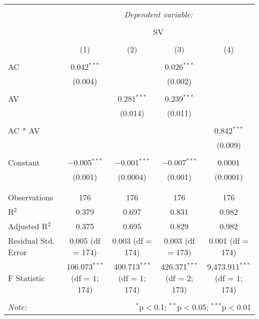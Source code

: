 
\begin{table}[!htbp] \centering 
  \caption{} 
  \label{} 
\begin{tabular}{@{\extracolsep{5pt}}lcccc} 
\\[-1.8ex]\hline 
\hline \\[-1.8ex] 
 & \multicolumn{4}{c}{\textit{Dependent variable:}} \\ 
\cline{2-5} 
\\[-1.8ex] & \multicolumn{4}{c}{SV} \\ 
\\[-1.8ex] & (1) & (2) & (3) & (4)\\ 
\hline \\[-1.8ex] 
 AC & 0.042$^{***}$ &  & 0.026$^{***}$ &  \\ 
  & (0.004) &  & (0.002) &  \\ 
  & & & & \\ 
 AV &  & 0.281$^{***}$ & 0.239$^{***}$ &  \\ 
  &  & (0.014) & (0.011) &  \\ 
  & & & & \\ 
 AC * AV &  &  &  & 0.842$^{***}$ \\ 
  &  &  &  & (0.009) \\ 
  & & & & \\ 
 Constant & $-$0.005$^{***}$ & $-$0.001$^{***}$ & $-$0.007$^{***}$ & 0.0001 \\ 
  & (0.001) & (0.0004) & (0.001) & (0.0001) \\ 
  & & & & \\ 
\hline \\[-1.8ex] 
Observations & 176 & 176 & 176 & 176 \\ 
R$^{2}$ & 0.379 & 0.697 & 0.831 & 0.982 \\ 
Adjusted R$^{2}$ & 0.375 & 0.695 & 0.829 & 0.982 \\ 
Residual Std. Error & 0.005 (df = 174) & 0.003 (df = 174) & 0.003 (df = 173) & 0.001 (df = 174) \\ 
F Statistic & 106.073$^{***}$ (df = 1; 174) & 400.713$^{***}$ (df = 1; 174) & 426.371$^{***}$ (df = 2; 173) & 9,473.911$^{***}$ (df = 1; 174) \\ 
\hline 
\hline \\[-1.8ex] 
\textit{Note:}  & \multicolumn{4}{r}{$^{*}$p$<$0.1; $^{**}$p$<$0.05; $^{***}$p$<$0.01} \\ 
\end{tabular} 
\end{table} 
